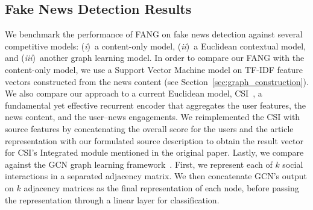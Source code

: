 \documentclass[sigconf,anonymous]{acmart}
\theoremstyle{definition}
\theoremstyle{hypothesis}
\begin{document}
\subsection{Fake News Detection Results}\label{sec:macroscopic}
We benchmark the performance of FANG on fake news detection against several competitive models: (\emph{i})~a content-only model, (\emph{ii})~a Euclidean contextual model, and (\emph{iii})~another graph learning model. 
In order to compare our FANG with the content-only model, 
we use a Support Vector Machine model on TF-IDF feature vectors constructed from the news content (see Section~\ref{sec:graph_construction}). 
We also compare our approach to a current Euclidean model,  
CSI~\cite{ruchansky2017csi}, a fundamental yet effective recurrent encoder that aggregates the user features, the news content, and the user--news engagements. We reimplemented the CSI with source features by concatenating the overall score for the users and the article representation with our formulated source description to obtain
the result vector for CSI's Integrated module mentioned in the original paper. Lastly, we compare against the GCN graph learning framework~\cite{kipf2016semi}. First, we represent each of $k$ social interactions in a separated adjacency matrix. We then concatenate GCN's output on $k$ adjacency matrices as the final representation of each node, before passing the representation through a linear layer for classification.
\end{document}

